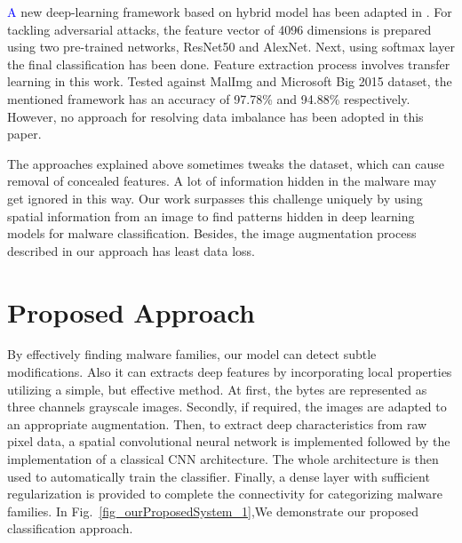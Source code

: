 \documentclass[pdflatex,sn-mathphys]{sn-jnl}%
\begin{document}
\par
 \textcolor{blue}
A new deep-learning framework based on hybrid model has been adapted in \cite{40}. For tackling adversarial attacks, the feature vector of 4096 dimensions is prepared using two pre-trained networks, ResNet50 and AlexNet. Next, using softmax layer the final classification has been done. Feature extraction process involves transfer learning in this work. Tested against MalImg and Microsoft Big 2015 dataset, the mentioned framework has an accuracy of 97.78\% and 94.88\%
respectively. However, no approach for resolving data imbalance has been adopted in this paper.  

\color{black}
\par
The approaches explained above sometimes tweaks the dataset, which can cause removal of concealed features.
A lot of information hidden in the malware may get ignored in this way. Our work surpasses this challenge uniquely by using spatial information from an image to find patterns hidden in deep  
learning models for malware classification.  \color{blue}Besides, the image augmentation process described in our approach has least data loss.  
\color{black}
\section{Proposed Approach}
\label{approach}

By effectively finding malware families, our model can detect subtle modifications. Also it can extracts deep features by incorporating local properties utilizing a simple, but effective method. At first, the bytes are represented as three channels grayscale images. Secondly, if required, the images are adapted to an appropriate augmentation. Then, to extract deep characteristics from raw pixel data, a spatial convolutional neural network is implemented followed by the implementation of a classical CNN architecture. The whole architecture is then used to automatically train the classifier. Finally, a dense layer with sufficient regularization is provided to complete the connectivity for categorizing malware families. In Fig.~\ref{fig_ourProposedSystem_1},We demonstrate our proposed classification approach.
\end{document}
